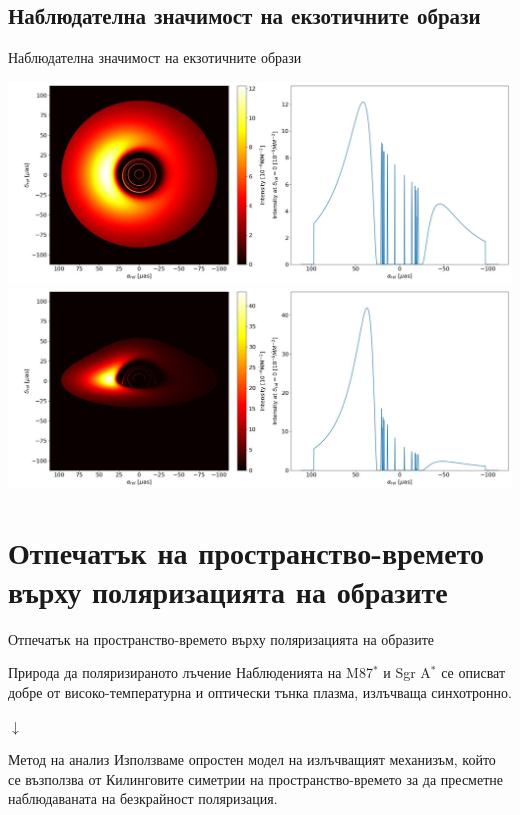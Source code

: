 \documentclass[hyperref={colorlinks,citecolor=blue,linkcolor=blue,urlcolor=blue}]{beamer}
\begin{document}
	\subsection{Наблюдателна значимост на екзотичните образи}
	
	\begin{frame}{Наблюдателна значимост на екзотичните образи}

		\centering
		\includegraphics[scale = 0.3]{Pre-Defence/WH_20_deg.jpg}
		\includegraphics[scale = 0.3]{Pre-Defence/WH_70_deg.jpg}

		
	\end{frame}
	
	\section{Отпечатък на пространство-времето върху поляризацията на образите}
	
	\begin{frame}{Отпечатък на пространство-времето върху поляризацията на образите}
		\begin{block}{Природа да поляризираното лъчение}
			Наблюденията на M87$^*$ и Sgr A$^*$ се описват добре от високо-температурна и оптически тънка плазма, излъчваща синхотронно.
		\end{block}
		
		\begin{center}
			$\downarrow$
		\end{center}
		
		\begin{block}{Метод на анализ}
			Използваме опростен модел на излъчващият механизъм, който се възползва от Килинговите симетрии на пространство-времето за да пресметне наблюдаваната на безкрайност поляризация.
		\end{block}
	\end{frame}
	
\end{document}
